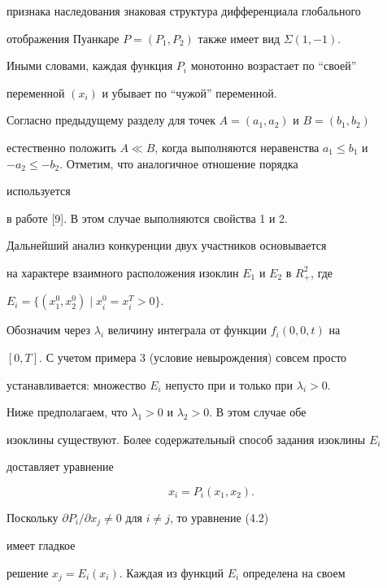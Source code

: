 признака наследования знаковая структура дифференциала глобального 


отображения Пуанкаре $P=(P_1,P_2)$ также имеет вид $\Sigma(1,-1)$. 


Иными словами, каждая функция $P_i$ монотонно возрастает по ``своей'' 


переменной $(x_i)$ и убывает по ``чужой'' переменной. 


 


Согласно предыдущему разделу для точек $A=(a_1,a_2)$ и $B=(b_1,b_2)$ 


естественно положить $A\ll B$, когда выполняются неравенства $a_1\le 


b_1$ и $-a_2\le-b_2$. Отметим, что аналогичное отношение порядка 


используется 


в работе [9]. В этом случае выполняются свойства 1 и 2. 


 


Дальнейший анализ конкуренции двух участников основывается 


на характере взаимного расположения изоклин $E_1$ и $E_2$ в $R^2_+$, где 


$E_i=\{(x^0_1,x^0_2)\mid x^0_i=x^T_i>0\}$. 


Обозначим через $\lambda_i$ величину интеграла от функции $f_i(0,0,t)$ на 


$[0,T]$. С учетом примера 3 (условие невырождения) совсем просто 


устанавливается: множество $E_i$ непусто при и только при $\lambda_i>0$. 


 


Ниже предполагаем, что $\lambda_1>0$ и $\lambda_2>0$. В этом случае обе 


изоклины существуют. Более содержательный способ задания изоклины $E_i$ 


доставляет уравнение 


\begin{equation} 


x_i=P_i(x_1,x_2). 


\end{equation} 


Поскольку $\partial P_i/\partial x_j\ne0$ для $i\ne j$, то уравнение (4.2) 


имеет гладкое 


решение $x_j=E_i(x_i)$. Каждая из функций $E_i$ определена на своем 


